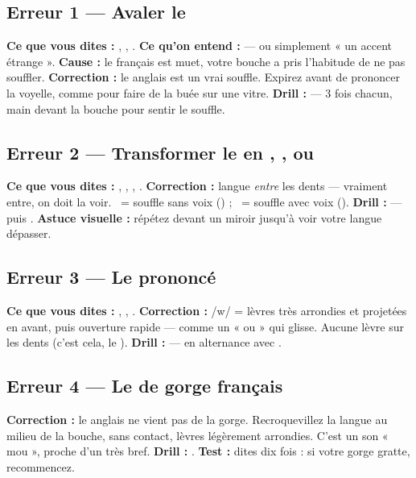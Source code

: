 \subsection{Erreur 1 --- Avaler le }
\textbf{Ce que vous dites :}  ,  ,  .
\textbf{Ce qu'on entend :}  --- ou simplement « un accent étrange ».
\textbf{Cause :} le  français est muet, votre bouche a pris l'habitude de ne pas souffler.
\textbf{Correction :} le  anglais est un vrai souffle. Expirez avant de prononcer la
voyelle, comme pour faire de la buée sur une vitre.
\textbf{Drill :}  --- 3 fois chacun, main devant la
bouche pour sentir le souffle.

\subsection{Erreur 2 --- Transformer le  en , ,  ou }
\textbf{Ce que vous dites :}  ,  , 
,  .
\textbf{Correction :} langue \emph{entre} les dents --- vraiment entre, on doit la voir.
\ipatheta\ = souffle sans voix () ; \ipadh\ = souffle avec voix ().
\textbf{Drill :}  --- puis .
\textbf{Astuce visuelle :} répétez devant un miroir jusqu'à voir votre langue dépasser.

\subsection{Erreur 3 --- Le  prononcé }
\textbf{Ce que vous dites :}  ,  ,  .
\textbf{Correction :} /w/ = lèvres très arrondies et projetées en avant, puis ouverture
rapide --- comme un « ou » qui glisse. Aucune lèvre sur les dents (c'est cela, le ).
\textbf{Drill :}  --- en alternance avec
.

\subsection{Erreur 4 --- Le  de gorge français}
\textbf{Correction :} le  anglais ne vient pas de la gorge. Recroquevillez la langue
au milieu de la bouche, sans contact, lèvres légèrement arrondies. C'est un son « mou »,
proche d'un  très bref.
\textbf{Drill :} .
\textbf{Test :} dites  dix fois : si votre gorge gratte, recommencez.

